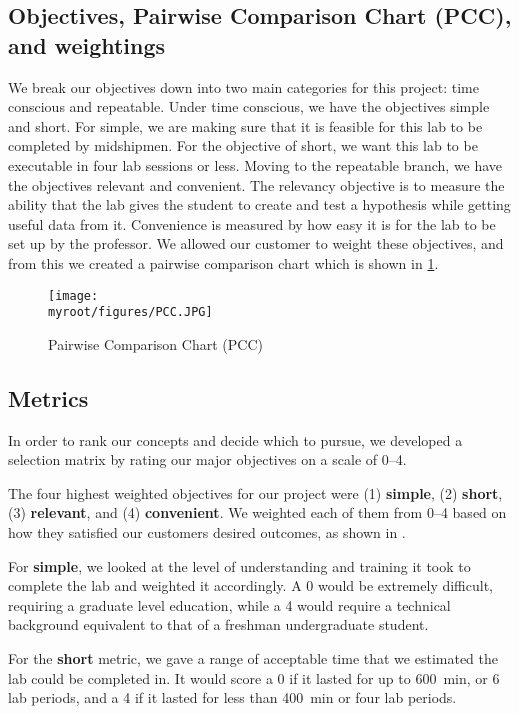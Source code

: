 \documentclass[twocolumn,10pt]{IEEEtran}
\newcommand{\myroot}{.}
\begin{document}
\subsection{Objectives, Pairwise Comparison Chart (PCC), and weightings}
\label{subsec:objectives}
We break our objectives down into two main categories for this project: time conscious and repeatable. Under time conscious, we have the objectives simple and short. For simple, we are making sure that it is feasible for this lab to be completed by midshipmen. For the objective of short, we want this lab to be executable in four lab sessions or less. Moving to the repeatable branch, we have the objectives relevant and convenient. The relevancy objective is to measure the ability that the lab gives the student to create and test a hypothesis while getting useful data from it. Convenience is measured by how easy it is for the lab to be set up by the professor. We allowed our customer to weight these objectives, and from this we created a pairwise comparison chart which is shown in \ref{fig:pcc}. 
\begin{figure}[ht!]
\centering
\texttt{[image: \\myroot/figures/PCC.JPG]}
\caption{Pairwise Comparison Chart (PCC)}
\label{fig:pcc}
\end{figure}

\subsection{Metrics}
In order to rank our concepts and decide which to pursue, we developed a selection matrix by rating our major objectives on a scale of 0--4. 

The four highest weighted objectives for our project were (1) \textbf{simple}, (2) \textbf{short}, (3) \textbf{relevant}, and (4) \textbf{convenient}. We weighted each of them from 0--4 based on how they satisfied our customers desired outcomes, as shown in . 

For \textbf{simple}, we looked at the level of understanding and training it took to complete the lab and weighted it accordingly. A 0 would be extremely difficult, requiring a graduate level education, while a 4 would require a technical background equivalent to that of a freshman undergraduate student. 

For the \textbf{short} metric, we gave a range of acceptable time that we estimated the lab could be completed in. It would score a 0 if it lasted for up to \SI{600}{\minute}, or 6 lab periods, and a 4 if it lasted for less than \SI{400}{\minute} or four lab periods. 
\end{document}
